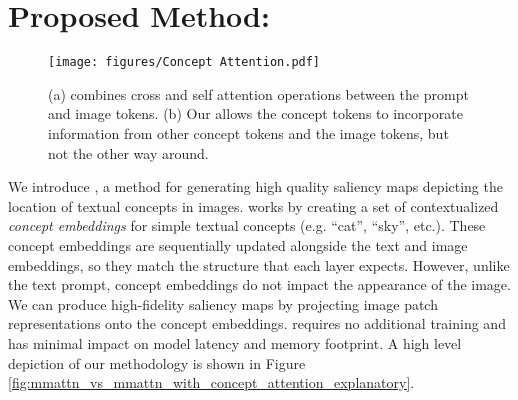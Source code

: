 


\section{Proposed Method: \tool{}}


\begin{figure}[t!]
    \centering
    \texttt{[image: figures/Concept Attention.pdf]}
    \vspace{-0.3in}
    \caption{(a) \layername{} combines cross and self attention operations between the prompt and image tokens. (b) Our \tool{} allows the concept tokens to incorporate information from other concept tokens and the image tokens, but not the other way around. }
    \label{fig:multi_modal_attention_vs_concept_attention}
\end{figure}

We introduce \tool{}, a method for generating high quality saliency maps depicting the location of textual concepts in images. \tool{} works by creating a set of contextualized \textit{concept embeddings} for simple textual concepts (e.g. ``cat'', ``sky'', etc.). These concept embeddings are sequentially updated alongside the text and image embeddings, so they match the structure that each \layername{} layer expects. However, unlike the text prompt, concept embeddings do not impact the appearance of the image. We can produce high-fidelity saliency maps by projecting image patch representations onto the concept embeddings. \tool{} requires no additional training and has minimal impact on model latency and memory footprint.  A high level depiction of our methodology is shown in Figure \ref{fig:mmattn_vs_mmattn_with_concept_attention_explanatory}.

